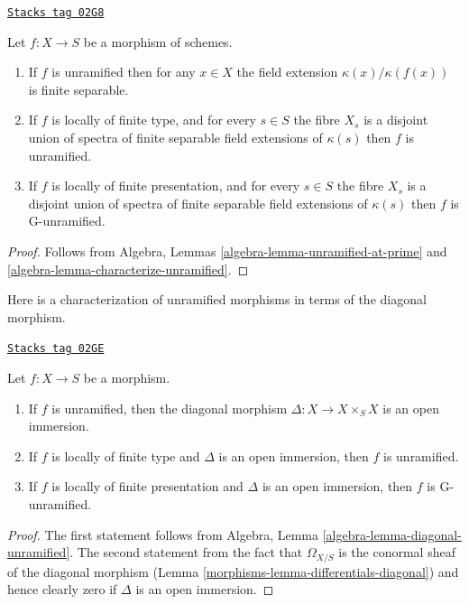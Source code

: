 \begin{lemma}
\label{morphisms-lemma-unramified-etale-fibres}
\href{https://stacks.math.columbia.edu/tag/02G8}{\texttt{Stacks tag 02G8}}

Let $f : X \to S$ be a morphism of schemes.
\begin{enumerate}
\item If $f$ is unramified then for any $x \in X$ the field extension
$\kappa(x)/\kappa(f(x))$ is finite separable.
\item If $f$ is locally of finite type, and for every
$s \in S$ the fibre $X_s$ is a disjoint union of spectra of finite separable
field extensions of $\kappa(s)$ then $f$ is unramified.
\item If $f$ is locally of finite presentation, and for every
$s \in S$ the fibre $X_s$ is a disjoint union of spectra of finite separable
field extensions of $\kappa(s)$ then $f$ is G-unramified.
\end{enumerate}
\end{lemma}

\begin{proof}
Follows from Algebra, Lemmas
\ref{algebra-lemma-unramified-at-prime} and
\ref{algebra-lemma-characterize-unramified}.
\end{proof}

Here is a characterization of unramified morphisms in terms of the
diagonal morphism.

\begin{lemma}
\label{morphisms-lemma-diagonal-unramified-morphism}
\href{https://stacks.math.columbia.edu/tag/02GE}{\texttt{Stacks tag 02GE}}

Let $f : X \to S$ be a morphism.
\begin{enumerate}
\item If $f$ is unramified, then the diagonal morphism
$\Delta : X \to X \times_S X$ is an open immersion.
\item If $f$ is locally of finite type
and $\Delta$ is an open immersion, then $f$ is unramified.
\item If $f$ is locally of finite presentation and $\Delta$ is an open
immersion, then $f$ is G-unramified.
\end{enumerate}
\end{lemma}

\begin{proof}

The first statement follows from
Algebra, Lemma \ref{algebra-lemma-diagonal-unramified}.
The second statement from the fact that $\Omega_{X/S}$
is the conormal sheaf of the diagonal morphism
(Lemma \ref{morphisms-lemma-differentials-diagonal})
and hence clearly zero if $\Delta$ is an open immersion.
\end{proof}

